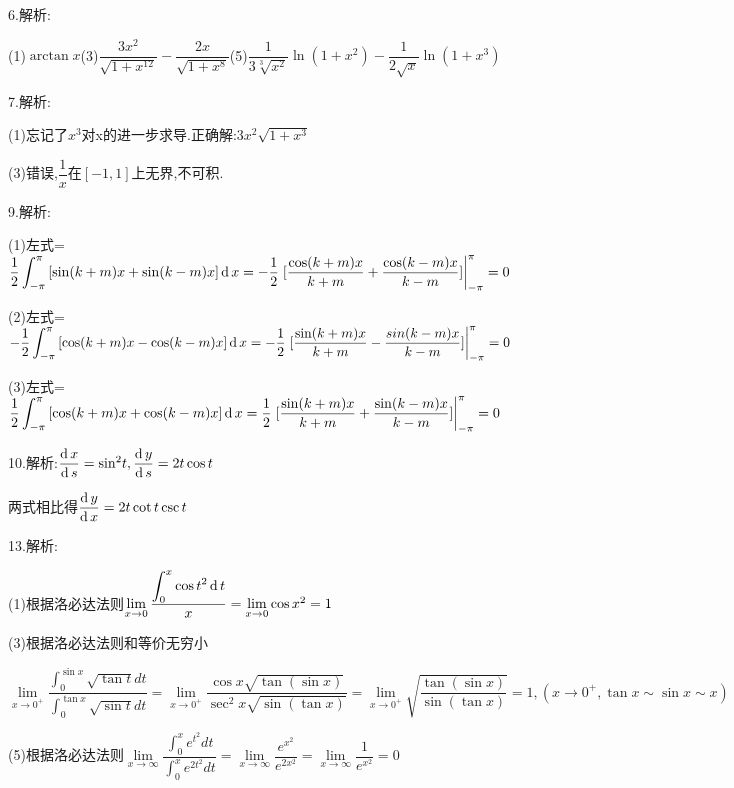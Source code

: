 6.解析:

(1)$\arctan x$(3)$\dfrac{{3{x^2}}}{{\sqrt {1 + {x^{12}}} }} - \dfrac{{2x}}{{\sqrt {1 + {x^8}} }}$(5)$\dfrac{1}{{3\sqrt[3]{{{x^2}}}}}\ln (1 + {x^2}) - \dfrac{1}{{2\sqrt x }}\ln (1 + {x^3})$

7.解析:

(1)忘记了$x^3$对x的进一步求导.正确解:$3{x^2}\sqrt {1 + {x^3}} $

(3)错误,$\dfrac{1}{x}$在$[-1,1]$上无界,不可积.

9.解析:

(1)左式=$\dfrac{1}{2}\displaystyle\int_{ - \pi }^\pi  {[\sin (k + m)x + \sin (k - m)x]\operatorname{\mathop{}\!\mathrm{d}}x =  - \dfrac{1}{2}\left. {[\dfrac{{\cos (k + m)x}}{{k + m}} + \dfrac{{\cos (k - m)x}}{{k - m}}]} \right|} _{ - \pi }^\pi  = 0$

(2)左式=$ - \dfrac{1}{2}\displaystyle\int_{ - \pi }^\pi  {[\cos (k + m)x - \cos (k - m)x]\operatorname{\mathop{}\!\mathrm{d}}x =  - \dfrac{1}{2}\left. {[\dfrac{{\sin (k + m)x}}{{k + m}} - \dfrac{{sin(k - m)x}}{{k - m}}]} \right|} _{ - \pi }^\pi  = 0$

(3)左式=$\dfrac{1}{2}\displaystyle\int_{ - \pi }^\pi  {[\cos (k + m)x + \cos (k - m)x]\operatorname{\mathop{}\!\mathrm{d}}x = \dfrac{1}{2}\left. {[\frac{{\sin (k + m)x}}{{k + m}} + \dfrac{{\sin (k - m)x}}{{k - m}}]} \right|} _{ - \pi }^\pi  = 0$

10.解析:$\dfrac{{\operatorname{\mathop{}\!\mathrm{d}} x}}{{\operatorname{\mathop{}\!\mathrm{d}} s}} = {\sin ^2}t,\dfrac{{\operatorname{\mathop{}\!\mathrm{d}} y}}{{\operatorname{\mathop{}\!\mathrm{d}} s}} = 2t\cos t$

两式相比得$\dfrac{{\operatorname{\mathop{}\!\mathrm{d}} y}}{{\operatorname{\mathop{}\!\mathrm{d}} x}} = 2t\cot t\csc t$

13.解析:

(1)根据洛必达法则$\mathop {\lim }\limits_{x \to 0} \dfrac{{\displaystyle\int_0^x {\cos {t^2}\operatorname{\mathop{}\!\mathrm{d}} t} }}{x} = \mathop {\lim }\limits_{x \to 0} \cos {x^2} = 1$

(3)根据洛必达法则和等价无穷小

$\mathop {\lim }\limits_{x \to {0^+ }} \dfrac{{\displaystyle\int_0^{\sin x} {\sqrt {\tan t} dt} }}{{\displaystyle\int_0^{\tan x} {\sqrt {\sin t} dt} }} = \mathop {\lim }\limits_{x \to {0^+ }} \dfrac{{\cos x\sqrt {\tan (\sin x )}}}{{{{\sec }^2}x\sqrt {\sin (\tan x)} }} = \mathop {\lim }\limits_{x \to {0^+ }} \sqrt {\dfrac{{\tan (\sin x)}}{{\sin (\tan x)}}}  = 1,\left( {x \to {0^+ },\tan x \sim \sin x \sim x} \right)$

(5)根据洛必达法则$\mathop {\lim }\limits_{x \to \infty } \dfrac{{\displaystyle\int_0^x {{e^{{t^2}}}dt} }}{{\displaystyle\int_0^x {{e^{2{t^2}}}dt} }} = \mathop {\lim }\limits_{x \to \infty } \dfrac{{{e^{{x^2}}}}}{{{e^{2{x^2}}}}} = \mathop {\lim }\limits_{x \to \infty } \dfrac{1}{{{e^{{x^2}}}}} = 0$

